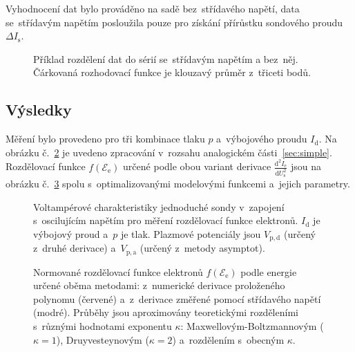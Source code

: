 \documentclass{protokol}
\newcommand\pres{p}
\newcommand\idisch{I_\mathrm{d}}
\newcommand\iprobe{I_\mathrm{s}}
\newcommand\ielec{I_\mathrm{e}}
\newcommand\plpota{V_\mathrm{p,a}}
\newcommand\plpotd{V_\mathrm{p,d}}
\newcommand\uprobe{U_\mathrm{s}}
\newcommand\didu{\frac{\mathrm d^2 \ielec}{\mathrm d \uprobe^2}}
\newcommand\enelec{\mathcal E_\mathrm{e}}
\newcommand\eedf{f(\enelec)}
\begin{document}
Vyhodnocení dat bylo prováděno na sadě bez~střídavého napětí,
data se~střídavým napětím posloužila pouze pro získání přírůstku
sondového proudu $\Delta\iprobe$.

\begin{figure}[hbp]
	\centering
	
	\caption{Příklad rozdělení dat do sérií se~střídavým napětím a bez~něj.
		Čárkovaná rozhodovací funkce je klouzavý průměr z~třiceti bodů.}
	\label{fig:separation}
\end{figure}

\subsection{Výsledky}
\label{sec:results-eedf}
Měření bylo provedeno pro tři kombinace tlaku $\pres$ a~výbojového
proudu $\idisch$.
Na obrázku č.~\ref{fig:simple2-vac} je uvedeno zpracování v~rozsahu
analogickém části~\ref{sec:simple}.
Rozdělovací funkce $\eedf$ určené podle obou variant derivace $\didu$
jsou na obrázku č.~\ref{fig:eedf} spolu s~optimalizovanými modelovými
funkcemi a~jejich parametry.

\begin{figure}[p]
	\centering
	
	
	\par\smallskip
	
	
	\par\smallskip
	
	
	\caption{Voltampérové charakteristiky jednoduché sondy
		v~zapojení s~oscilujícím napětím
		pro měření rozdělovací funkce elektronů.
		$\idisch$ je výbojový proud a~$\pres$ je tlak.
		Plazmové potenciály jsou $\plpotd$ (určený z~druhé derivace)
		a~$\plpota$ (určený z~metody asymptot).}
	\label{fig:simple2-vac}
\end{figure}

\begin{figure}[p]
	\centering
	
	\par\smallskip
	
	\par\smallskip
	
	\caption{Normované rozdělovací funkce elektronů $\eedf$ podle energie určené
		oběma metodami: z~numerické derivace proloženého polynomu (červené)
		a~z~derivace změřené pomocí střídavého napětí (modré).
		Průběhy jsou aproximovány teoretickými rozděleními s~různými hodnotami
		exponentu $\kappa$:
		Max\-wellovým-Boltzmannovým ($\kappa = 1$),
		Druyvesteynovým ($\kappa = 2$)
		a~rozdělením s~obecným $\kappa$.}
	\label{fig:eedf}
\end{figure}
\end{document}
